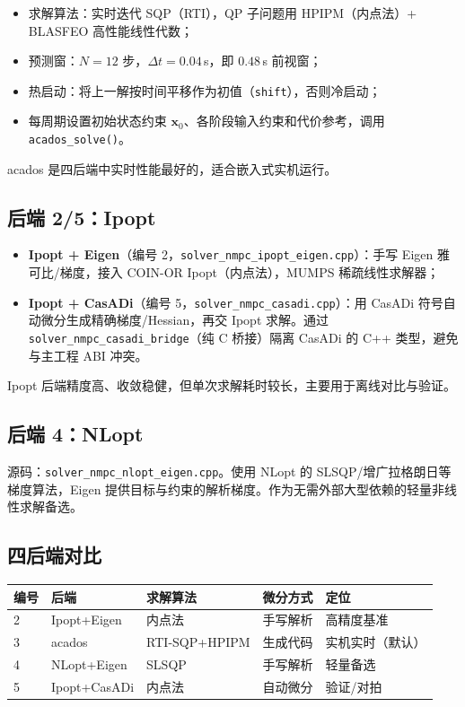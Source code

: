 \documentclass[UTF8, a4paper, 11pt]{ctexart}
\newcommand{\bx}{\mathbf{x}}
\begin{document}
\begin{itemize}
  \item 求解算法：实时迭代 SQP（RTI），QP 子问题用 HPIPM（内点法）+ BLASFEO 高性能线性代数；
  \item 预测窗：$N=12$ 步，$\Delta t = 0.04$\,s，即 $0.48$\,s 前视窗；
  \item 热启动：将上一解按时间平移作为初值（\texttt{shift}），否则冷启动；
  \item 每周期设置初始状态约束 $\bx_0$、各阶段输入约束和代价参考，调用 \texttt{acados\_solve()}。
\end{itemize}
acados 是四后端中实时性能最好的，适合嵌入式实机运行。

\subsection{后端 2/5：Ipopt}

\begin{itemize}
  \item \textbf{Ipopt + Eigen}（编号 2，\texttt{solver\_nmpc\_ipopt\_eigen.cpp}）：手写 Eigen 雅可比/梯度，接入 COIN-OR Ipopt（内点法），MUMPS 稀疏线性求解器；
  \item \textbf{Ipopt + CasADi}（编号 5，\texttt{solver\_nmpc\_casadi.cpp}）：用 CasADi 符号自动微分生成精确梯度/Hessian，再交 Ipopt 求解。通过 \texttt{solver\_nmpc\_casadi\_bridge}（纯 C 桥接）隔离 CasADi 的 C++ 类型，避免与主工程 ABI 冲突。
\end{itemize}
Ipopt 后端精度高、收敛稳健，但单次求解耗时较长，主要用于离线对比与验证。

\subsection{后端 4：NLopt}

源码：\texttt{solver\_nmpc\_nlopt\_eigen.cpp}。使用 NLopt 的 SLSQP/增广拉格朗日等梯度算法，Eigen 提供目标与约束的解析梯度。作为无需外部大型依赖的轻量非线性求解备选。

\subsection{四后端对比}

\begin{center}
\begin{tabular}{lllll}
\toprule
编号 & 后端 & 求解算法 & 微分方式 & 定位 \\
\midrule
2 & Ipopt+Eigen  & 内点法 & 手写解析 & 高精度基准 \\
3 & acados       & RTI-SQP+HPIPM & 生成代码 & 实机实时（默认）\\
4 & NLopt+Eigen  & SLSQP & 手写解析 & 轻量备选 \\
5 & Ipopt+CasADi & 内点法 & 自动微分 & 验证/对拍 \\
\bottomrule
\end{tabular}
\end{center}
\end{document}
